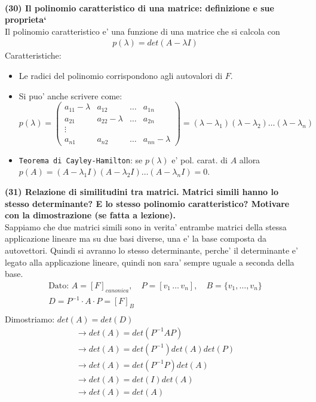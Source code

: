 \documentclass[10pt]{extarticle}
\begin{document}
\hfill \\
\textbf{(30) Il polinomio caratteristico di una matrice: definizione e sue proprieta`}\\
Il polinomio caratteristico e' una funzione di una matrice che si calcola con 
\begin{align*}
    p(\lambda)=det(A-\lambda I)
\end{align*}
Caratteristiche:
\begin{itemize}
    \item Le radici del polinomio corrispondono agli autovalori di $F$.
    \item Si puo' anche scrivere come: $p(\lambda)=\begin{pmatrix}
        a_{11}-\lambda & a_{12} & \dots & a_{1n} \\
        a_{21} & a_{22}-\lambda & \dots & a_{2n} \\
        \vdots \\
        a_{n1} & a_{n2} & \dots & a_{nn}-\lambda
    \end{pmatrix}=(\lambda - \lambda_1)(\lambda - \lambda_2)\dots(\lambda - \lambda_n)$
    \item \texttt{Teorema di Cayley-Hamilton}: se $p(\lambda)$ e' pol. carat. di $A$ allora $p(A)=(A-\lambda_1 I)(A-\lambda_2 I)\dots(A-\lambda_n I)=0$.
\end{itemize}
\vspace{1em}
\textbf{(31) Relazione di similitudini tra matrici. Matrici simili hanno lo stesso determinante? E lo stesso polinomio caratteristico? Motivare con la dimostrazione (se fatta a lezione).} \\
Sappiamo che due matrici simili sono in verita' entrambe matrici della stessa applicazione lineare ma su due basi diverse, una e' la base composta da autovettori. Quindi si avranno lo stesso determinante, perche' il determinante e' legato alla applicazione lineare, quindi non sara' sempre uguale a seconda della base.
\begin{align*}
    \text{Dato: } A=[F]_{canonica}, \quad  P=[v_1 \, \dots \, v_n] ,\quad B=\{v_1,\dots,v_n\}\\
    D=P^{-1}\cdot A \cdot P=[F]_B \\
\end{align*}
Dimostriamo: $det(A)=det(D)$ 
\begin{align*}
    \to det(A)=det(P^{-1}AP)\\
    \to det(A)=det(P^{-1})det(A)det(P) \\
    \to det(A)=det(P^{-1}P)det(A) \\
    \to det(A)=det(I)det(A)\\
    \to det(A)=det(A)
\end{align*}
\end{document}
